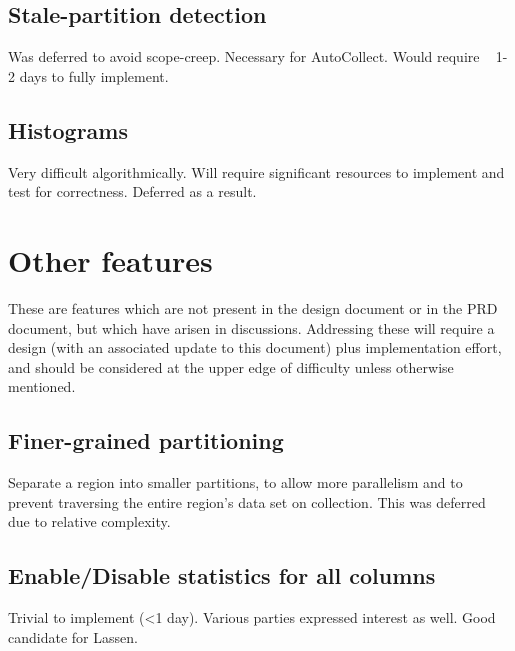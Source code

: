 \subsection{Stale-partition detection} Was deferred to avoid scope-creep. Necessary for AutoCollect. Would require ~ 1-2 days to fully implement.
\subsection{Histograms} Very difficult algorithmically. Will require significant resources to implement and test for correctness. Deferred as a result. 

\section{Other features}
These are features which are not present in the design document or in the PRD document, but which have arisen in discussions. Addressing these will require a design (with an associated update to this document) plus implementation effort, and should be considered at the upper edge of difficulty unless otherwise mentioned.

\subsection{Finer-grained partitioning} Separate a region into smaller partitions, to allow more parallelism and to prevent traversing the entire region's data set on collection. This was deferred due to relative complexity.
\subsection{Enable/Disable statistics for all columns} Trivial to implement (<1 day). Various parties expressed interest as well. Good candidate for Lassen.
